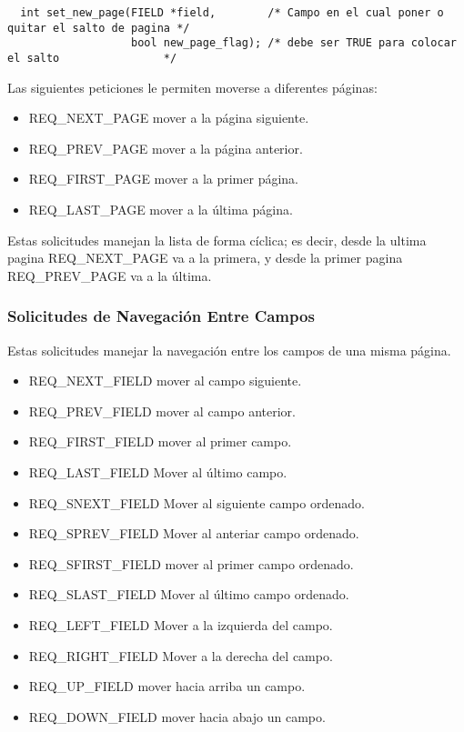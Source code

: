\documentclass{article}
\begin{document}
\begin{verbatim}
  int set_new_page(FIELD *field,        /* Campo en el cual poner o quitar el salto de pagina */
                   bool new_page_flag); /* debe ser TRUE para colocar el salto                */
\end{verbatim}

Las siguientes peticiones le permiten moverse a diferentes páginas:

\begin{itemize}
  \item REQ\_NEXT\_PAGE mover a la página siguiente.
  \item REQ\_PREV\_PAGE mover a la página anterior.
  \item REQ\_FIRST\_PAGE mover a la primer página.
  \item REQ\_LAST\_PAGE mover a la última página.
\end{itemize}

Estas solicitudes manejan la lista de forma cíclica; es decir, desde la ultima
pagina REQ\_NEXT\_PAGE va a la primera, y desde la primer pagina REQ\_PREV\_PAGE va
a la última.

\subsubsection{Solicitudes de Navegación Entre Campos}%
Estas solicitudes manejar la navegación entre los campos de una misma página.

\begin{itemize}
  \item REQ\_NEXT\_FIELD mover al campo siguiente.
  \item REQ\_PREV\_FIELD mover al campo anterior.
  \item REQ\_FIRST\_FIELD mover al primer campo.
  \item REQ\_LAST\_FIELD Mover al último campo.
  \item REQ\_SNEXT\_FIELD Mover al siguiente campo ordenado.
  \item REQ\_SPREV\_FIELD Mover al anteriar campo ordenado.
  \item REQ\_SFIRST\_FIELD mover al primer campo ordenado.
  \item REQ\_SLAST\_FIELD Mover al último campo ordenado.
  \item REQ\_LEFT\_FIELD Mover a la izquierda del campo.
  \item REQ\_RIGHT\_FIELD Mover a la derecha del campo.
  \item REQ\_UP\_FIELD mover hacia arriba un campo.
  \item REQ\_DOWN\_FIELD mover hacia abajo un campo.
\end{itemize}
\end{document}
